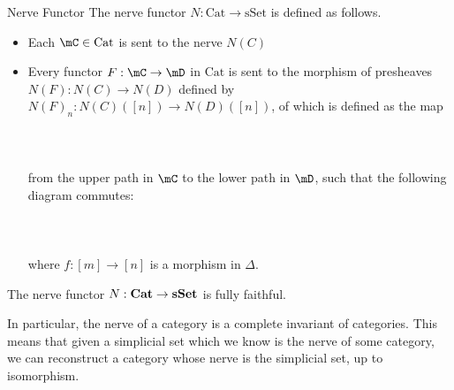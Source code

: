 \documentclass[a4paper]{article}
\begin{document}
\begin{defn}{Nerve Functor}{} The nerve functor $N:\text{Cat}\to\text{sSet}$ is defined as follows. 
\begin{itemize}
\item Each $\mC\in\text{Cat}$ is sent to the nerve $N(C)$
\item Every functor $F:\mC\to\mD$ in $\text{Cat}$ is sent to the morphism of presheaves $N(F):N(C)\to N(D)$ defined by $N(F)_n:N(C)([n])\to N(D)([n])$, of which is defined as the map \\~\\
\\~\\
from the upper path in $\mC$ to the lower path in $\mD$, such that the following diagram commutes: \\~\\
\\~\\
where $f:[m]\to[n]$ is a morphism in $\Delta$. 
\end{itemize}
\end{defn}

\begin{prp}{}{} The nerve functor $N:\bold{Cat}\to\bold{sSet}$ is fully faithful. 
\end{prp}

In particular, the nerve of a category is a complete invariant of categories. This means that given a simplicial set which we know is the nerve of some category, we can reconstruct a category whose nerve is the simplicial set, up to isomorphism. \\~\\
\end{document}
